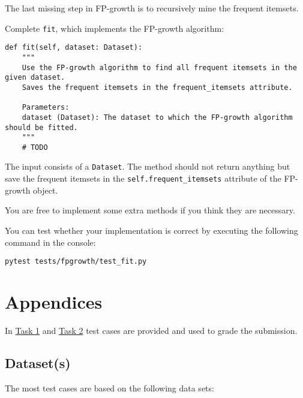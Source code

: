 \documentclass[
english,
smallborders
]{i6prcsht}
\begin{document}
The last missing step in FP-growth is to recursively mine the frequent itemsets.

Complete \texttt{fit}, which implements the FP-growth algorithm:

\vspace*{0.3cm}

\begin{lstlisting}
def fit(self, dataset: Dataset):
	"""
	Use the FP-growth algorithm to find all frequent itemsets in the given dataset.
	Saves the frequent itemsets in the frequent_itemsets attribute.

	Parameters:
	dataset (Dataset): The dataset to which the FP-growth algorithm should be fitted.
	"""
	# TODO
\end{lstlisting}

\vspace*{0.1cm}

The input consists of a \texttt{Dataset}. The method should not return anything but save the frequent itemsets in the \texttt{self.frequent\_itemsets} attribute of the FP-growth object.

You are free to implement some extra methods if you think they are necessary.

You can test whether your implementation is correct by executing the following command in the console:

\vspace*{0.3cm}

\begin{lstlisting}
pytest tests/fpgrowth/test_fit.py
\end{lstlisting}











\newpage

\section*{Appendices}

In \hyperref[sec:task-one]{Task 1} and \hyperref[sec:task-one]{Task 2} test cases are provided and used to grade the submission.

\subsection*{Dataset(s)}

The most test cases are based on the following data sets:
\end{document}
